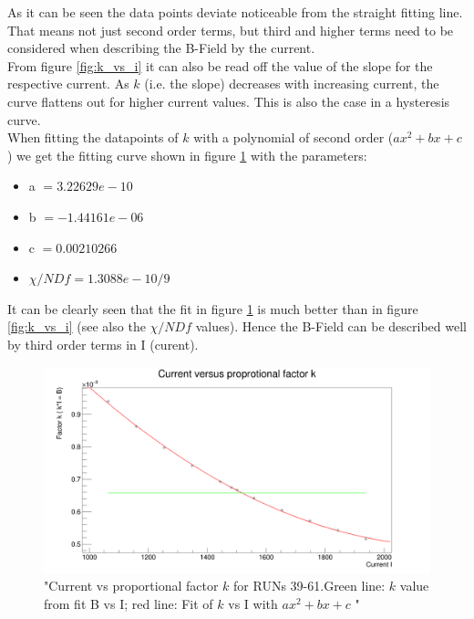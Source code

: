 \documentclass[12pt, letterpaper]{article}
\begin{document}
As it can be seen the data points deviate noticeable from the straight fitting line. That means not just second order terms, but third and higher terms need to be considered when describing the B-Field by the current. \\
From figure \ref{fig:k_vs_i} it can also be read off the value of the slope for the respective current. As $k$ (i.e. the slope) decreases with increasing current, the curve flattens out for higher current values. This is also the case in a hysteresis curve.\\
When fitting the datapoints of $k$ with a polynomial of second order ($ax^{2}+bx +c$) we get the fitting curve shown in figure \ref{fig:k_vs_i_pol2} with the parameters:\\
\begin{itemize}
\item a $= 3.22629e-10$
\item b $= -1.44161e-06$
\item c $= 0.00210266$
\item $\chi/NDf = 1.3088e-10/9$
\end{itemize}
It can be clearly seen that the fit in figure \ref{fig:k_vs_i_pol2} is much better than in figure \ref{fig:k_vs_i} (see also the $\chi/NDf$ values). Hence the B-Field can be described well by third order terms in I (curent).
\begin{figure}[!htbp]
	\centering
	\includegraphics[width=.9\linewidth]{k_pol2.png}
	\caption{"Current vs proportional factor $k$ for RUNs 39-61.Green line: $k$ value from fit B vs I; red line: Fit of $k$ vs I with $ax^{2}+bx +c$ "}
	\label{fig:k_vs_i_pol2}
\end{figure}
\end{document}
